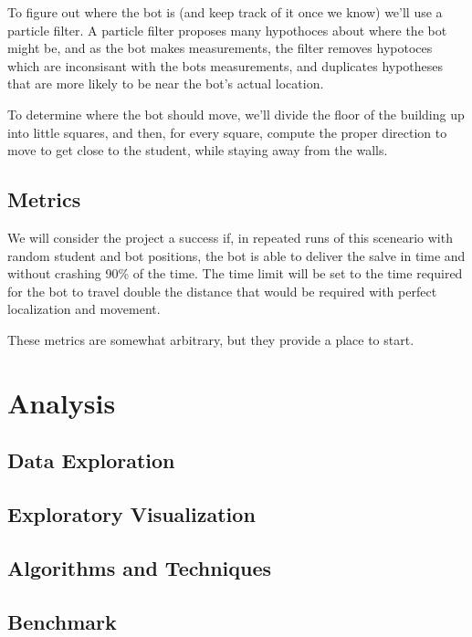 \documentclass[letterpaper]{article}
\begin{document}
To figure out where the bot is (and keep track of it once we know) we'll use a particle filter. A particle filter proposes many hypothoces about where the bot might be, and as the bot makes measurements, the filter removes hypotoces which are inconsisant with the bots measurements, and duplicates hypotheses that are more likely to be near the bot's actual location.

To determine where the bot should move, we'll divide the floor of the building up into little squares, and then, for every square, compute the proper direction to move to get close to the student, while staying away from the walls.


\subsection{Metrics}

We will consider the project a success if, in repeated runs of this sceneario with random student and bot positions, the bot is able to deliver the salve in time and without crashing 90\% of the time. The time limit will be set to the time required for the bot to travel double the distance that would be required with perfect localization and movement.

These metrics are somewhat arbitrary, but they provide a place to start.

\section{Analysis}

\subsection{Data Exploration}

\subsection{Exploratory Visualization}



\subsection{Algorithms and Techniques}


\subsection{Benchmark}
\end{document}
